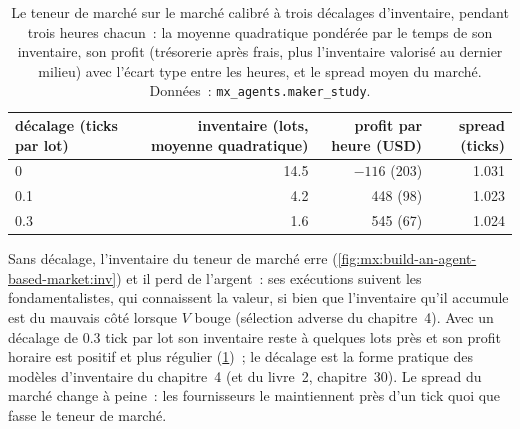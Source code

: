 \label{lst:mx:build-an-agent-based-market:mm}

\begin{table}[ht]
\centering
\small
\begin{tabular}{@{}lrrr@{}}
\toprule
décalage (ticks par lot) & inventaire (lots, moyenne quadratique) & profit par heure (USD) & spread (ticks) \\
\midrule
0 & 14.5 & $-116$ (203) & 1.031 \\
0.1 & 4.2 & 448 (98) & 1.023 \\
0.3 & 1.6 & 545 (67) & 1.024 \\
\bottomrule
\end{tabular}
\caption{Le teneur de marché sur le marché calibré à trois décalages d'inventaire, pendant trois heures chacun~: la moyenne quadratique pondérée par le temps de son inventaire,
son profit (trésorerie après frais, plus l'inventaire valorisé au dernier milieu) avec l'écart type entre les heures, et le spread moyen du marché. Données~:
\texttt{mx\_agents.maker\_study}.}\label{tab:mx:build-an-agent-based-market:mm}
\end{table}

Sans décalage, l'inventaire du teneur de marché erre (\cref{fig:mx:build-an-agent-based-market:inv}) et il perd de l'argent~: ses exécutions suivent les fondamentalistes,
qui connaissent la valeur, si bien que l'inventaire qu'il accumule est du mauvais côté lorsque $V$ bouge (sélection adverse du chapitre~4). Avec un décalage de 0.3 tick par lot
son inventaire reste à quelques lots près et son profit horaire est positif et plus régulier (\cref{tab:mx:build-an-agent-based-market:mm})~; le décalage est
la forme pratique des modèles d'inventaire du chapitre~4 (et du livre~2, chapitre~30). Le spread du marché change à peine~: les fournisseurs le maintiennent près d'un tick
quoi que fasse le teneur de marché.

